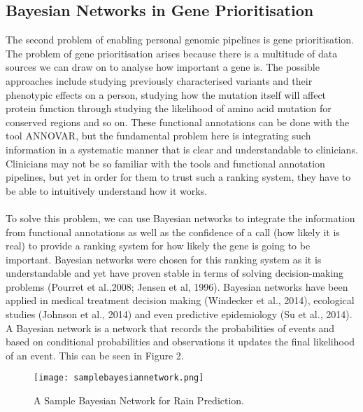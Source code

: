 \documentclass{article}
\begin{document}
\subsection{Bayesian Networks in Gene Prioritisation}
The second problem of enabling personal genomic pipelines is gene prioritisation. The problem of gene prioritisation arises because there is a multitude of data sources we can draw on to analyse how important a gene is. The possible approaches include studying previously characterised variants and their phenotypic effects on a person, studying how the mutation itself will affect protein function through studying the likelihood of amino acid mutation for conserved regions and so on. These functional annotations can be done with the tool ANNOVAR, but the fundamental problem here is integrating such information in a systematic manner that is clear and understandable to clinicians. Clinicians may not be so familiar with the tools and functional annotation pipelines, but yet in order for them to trust such a ranking system, they have to be able to intuitively understand how it works. \\\\
To solve this problem, we can use Bayesian networks to integrate the information from functional annotations as well as the confidence of a call (how likely it is real) to provide a ranking system for how likely the gene is going to be important. Bayesian networks were chosen for this ranking system as it is understandable and yet have proven stable in terms of solving decision-making problems (Pourret et al.,2008; Jensen et al, 1996). Bayesian networks have been applied in medical treatment decision making (Windecker et al., 2014), ecological studies (Johnson et al., 2014) and even predictive epidemiology (Su et al., 2014). A Bayesian network is a network that records the probabilities of events and based on conditional probabilities and observations it updates the final likelihood of an event. This can be seen in Figure 2.
\begin{figure}[H]
\texttt{[image: samplebayesiannetwork.png]}
\centering
\caption{A Sample Bayesian Network for Rain Prediction.}
\end{figure}
\end{document}
